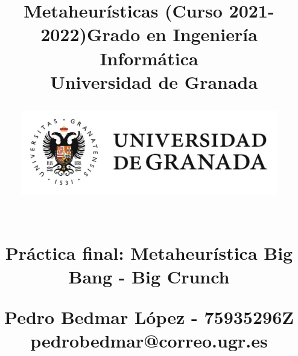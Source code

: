 



\title{	
\normalfont \normalsize 
\huge{\textbf{Metaheurísticas (Curso 2021-2022)}\linebreak \linebreak Grado en Ingeniería Informática \\ Universidad de Granada} \\ [23pt] %

\begin{figure}[H]
    \centering
        \includegraphics[scale=0.4]{img/ugr.png}
\end{figure}

\horrule{0.5pt} \\[0.4cm] %
\huge Práctica final: Metaheurística  \linebreak 
\huge Big Bang - Big Crunch \linebreak %
\horrule{2pt} \\[0.5cm] %
\vspace{2cm}

\Large{Pedro Bedmar López - 75935296Z} \\
\Large{pedrobedmar@correo.ugr.es} \linebreak

}

\date{}




\clearpage
\maketitle %
\thispagestyle{empty}

